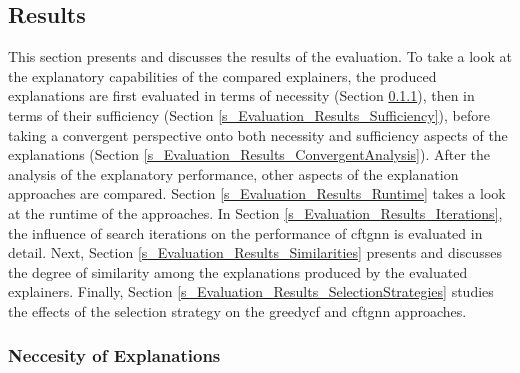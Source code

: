 \FloatBarrier
\subsection{Results}
\label{s_Evaluation_Results}

This section presents and discusses the results of the evaluation. To take a look at the explanatory capabilities of the compared explainers, the produced explanations are first evaluated in terms of necessity (Section \ref{s_Evaluation_Results_Neccesity}), then in terms of their sufficiency (Section \ref{s_Evaluation_Results_Sufficiency}), before taking a convergent perspective onto both necessity and sufficiency aspects of the explanations (Section \ref{s_Evaluation_Results_ConvergentAnalysis}). After the analysis of the explanatory performance, other aspects of the explanation approaches are compared. Section \ref{s_Evaluation_Results_Runtime} takes a look at the runtime of the approaches. In Section \ref{s_Evaluation_Results_Iterations}, the influence of search iterations on the performance of \gls{cftgnn} is evaluated in detail. Next, Section \ref{s_Evaluation_Results_Similarities} presents and discusses the degree of similarity among the explanations produced by the evaluated explainers. Finally, Section \ref{s_Evaluation_Results_SelectionStrategies} studies the effects of the selection strategy on the \gls{greedycf} and \gls{cftgnn} approaches.


 
\FloatBarrier
\subsubsection{Neccesity of Explanations}
\label{s_Evaluation_Results_Neccesity}

